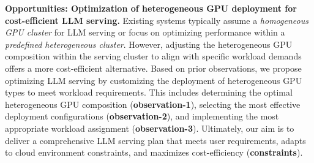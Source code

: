 \textbf{Opportunities: Optimization of heterogeneous GPU deployment for cost-efficient LLM serving.} Existing systems typically assume a \textit{homogeneous GPU cluster} for LLM serving or focus on optimizing performance within a \textit{predefined heterogeneous cluster}. However, adjusting the heterogeneous GPU composition within the serving cluster to align with specific workload demands offers a more cost-efficient alternative. Based on prior observations, we propose optimizing LLM serving by customizing the deployment of heterogeneous GPU types to meet workload requirements. This includes determining the optimal heterogeneous GPU composition (\textbf{observation-1}), selecting the most effective deployment configurations (\textbf{observation-2}), and implementing the most appropriate workload assignment (\textbf{observation-3}). Ultimately, our aim is to deliver a comprehensive LLM serving plan that meets user requirements, adapts to cloud environment constraints, and maximizes cost-efficiency (\textbf{constraints}).